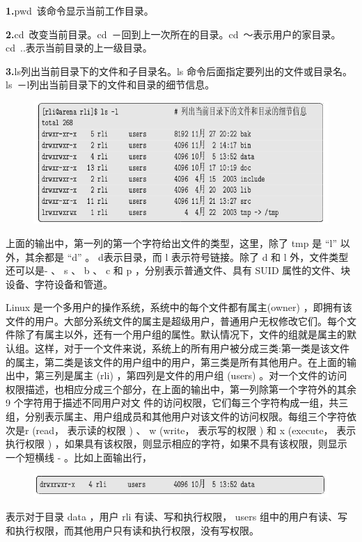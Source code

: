 \documentclass[12pt，a4paper]{article}
\numberwithin{equation}{section}
\begin{document}
\textbf{1.}pwd~该命令显示当前工作目录。

\textbf{2.}cd~改变当前目录。cd~－回到上一次所在的目录。cd~～表示用户的家目录。cd~..表示当前目录的上一级目录。

\textbf{3.}ls列出当前目录下的文件和子目录名。ls
 命令后面指定要列出的文件或目录名。ls~－l列出当前目录下的文件和目录的细节信息。
\begin{figure}[H]
\centering
\includegraphics[scale=0.6]{./figures/215.png}
\end{figure}
上面的输出中，第一列的第一个字符给出文件的类型，这里，除了 tmp 是 “l” 以外，其余都是 “d” 。 d表示目录，而 l 表示符号链接。除了 d 和 l 外，文件类型还可以是- 、 s 、 b 、 c 和 p ，分别表示普通文件、具有 SUID 属性的文件、块设备、字符设备和管道。

Linux 是一个多用户的操作系统，系统中的每个文件都有属主(owner) ，即拥有该文件的用户。大部分系统文件的属主是超级用户，普通用户无权修改它们。每个文件除了有属主以外，还有一个用户组的属性。默认情况下，文件的组就是属主的默认组。这样，对于一个文件来说，系统上的所有用户被分成三类:第一类是该文件的属主，第二类是该文件的用户组中的用户，第三类是所有其他用户。在上面的输出中，第三列是属主 (rli) ，第四列是文件的用户组 (users) 。对一个文件的访问权限描述，也相应分成三个部分，在上面的输出中，第一列除第一个字符外的其余 9 个字符用于描述不同用户对文
件的访问权限，它们每三个字符构成一组，共三组，分别表示属主、用户组成员和其他用户对该文件的访问权限。每组三个字符依次是r (read， 表示读的权限 ) 、 w (write， 表示写的权限 ) 和 x (execute， 表示执行权限 ) ，如果具有该权限，则显示相应的字符，如果不具有该权限，则显示一个短横线 - 。比如上面输出行，
\begin{figure}[H]
\centering
\includegraphics[scale=0.6]{./figures/216.png}
\end{figure}
表示对于目录 data ，用户 rli 有读、写和执行权限， users 组中的用户有读、写和执行权限，而其他用户只有读和执行权限，没有写权限。
\end{document}
